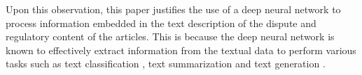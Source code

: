 
Upon this observation, this paper justifies the use of a deep neural network to process information embedded in the text description of the dispute and regulatory content of the articles. 
This is because the deep neural network is known to effectively
extract information from the textual data to perform various tasks such as text classification \citep{minaee2020deep}, text summarization \citep{textsum} and text generation \citep{guo2017long}.
 
 
 

